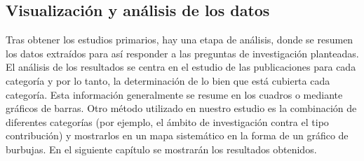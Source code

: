 \subsection{Visualización y análisis de los datos}
Tras obtener los estudios primarios, hay una etapa de análisis, donde se resumen los datos extraídos para así responder a las preguntas de investigación planteadas. El análisis de los resultados se centra en el estudio de las publicaciones para cada categoría y por lo tanto, la determinación de lo bien que está cubierta cada categoría. Esta información generalmente se resume en los cuadros o mediante gráficos de barras. Otro método utilizado en nuestro estudio es la combinación de diferentes categorías (por ejemplo, el ámbito de investigación contra el tipo contribución) y mostrarlos en un mapa sistemático en la forma de un gráfico de burbujas.
En el siguiente capítulo se mostrarán los resultados obtenidos.


